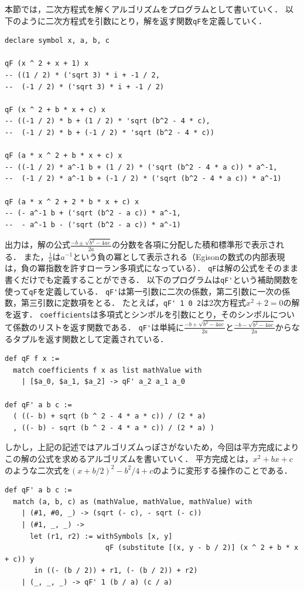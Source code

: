 本節では，二次方程式を解くアルゴリズムをプログラムとして書いていく．
以下のように二次方程式を引数にとり，解を返す関数\lstinline{qF}を定義していく．
\begin{lstlisting}[language=egison,numbers=none]
declare symbol x, a, b, c

qF (x ^ 2 + x + 1) x
-- ((1 / 2) * ('sqrt 3) * i + -1 / 2,
--  (-1 / 2) * ('sqrt 3) * i + -1 / 2)

qF (x ^ 2 + b * x + c) x
-- ((-1 / 2) * b + (1 / 2) * 'sqrt (b^2 - 4 * c),
--  (-1 / 2) * b + (-1 / 2) * 'sqrt (b^2 - 4 * c))

qF (a * x ^ 2 + b * x + c) x
-- ((-1 / 2) * a^-1 b + (1 / 2) * ('sqrt (b^2 - 4 * a c)) * a^-1,
--  (-1 / 2) * a^-1 b + (-1 / 2) * ('sqrt (b^2 - 4 * a c)) * a^-1)

qF (a * x ^ 2 + 2 * b * x + c) x
-- (- a^-1 b + ('sqrt (b^2 - a c)) * a^-1,
--  - a^-1 b - ('sqrt (b^2 - a c)) * a^-1)
\end{lstlisting}
出力は，解の公式$\frac{-b \pm \sqrt{b^2 - 4 a c}}{2 a}$の分数を各項に分配した積和標準形で表示される．
また，$\frac{1}{a}$は$a^{-1}$という負の冪として表示される（Egisonの数式の内部表現は，負の冪指数を許すローラン多項式になっている）．
\lstinline{qF}は解の公式をそのまま書くだけでも定義することができる．
以下のプログラムは\lstinline{qF'}という補助関数を使って\lstinline{qF}を定義している．
\lstinline{qF'}は第一引数に二次の係数，第二引数に一次の係数，第三引数に定数項をとる．
たとえば，\lstinline{qF' 1 0 2}は2次方程式$x^2 + 2 = 0$の解を返す．
\lstinline{coefficients}は多項式とシンボルを引数にとり，そのシンボルについて係数のリストを返す関数である．
\lstinline{qF'}は単純に$\frac{-b + \sqrt{b^2 - 4 a c}}{2 a}$と$\frac{-b - \sqrt{b^2 - 4 a c}}{2 a}$からなるタプルを返す関数として定義されている．
\begin{lstlisting}[language=egison,numbers=none]
def qF f x :=
  match coefficients f x as list mathValue with
    | [$a_0, $a_1, $a_2] -> qF' a_2 a_1 a_0

def qF' a b c :=
  ( ((- b) + sqrt (b ^ 2 - 4 * a * c)) / (2 * a)
  , ((- b) - sqrt (b ^ 2 - 4 * a * c)) / (2 * a) )
\end{lstlisting}
しかし，上記の記述ではアルゴリズムっぽさがないため，今回は平方完成によりこの解の公式を求めるアルゴリズムを書いていく．
平方完成とは，$x^2 + b x + c$のような二次式を$(x + b / 2)^2 - b^2 / 4 + c$のように変形する操作のことである．
\begin{lstlisting}[language=egison]
def qF' a b c :=
  match (a, b, c) as (mathValue, mathValue, mathValue) with
    | (#1, #0, _) -> (sqrt (- c), - sqrt (- c))
    | (#1, _, _) ->
      let (r1, r2) := withSymbols [x, y]
                        qF (substitute [(x, y - b / 2)] (x ^ 2 + b * x + c)) y
       in ((- (b / 2)) + r1, (- (b / 2)) + r2)
    | (_, _, _) -> qF' 1 (b / a) (c / a)
\end{lstlisting}

